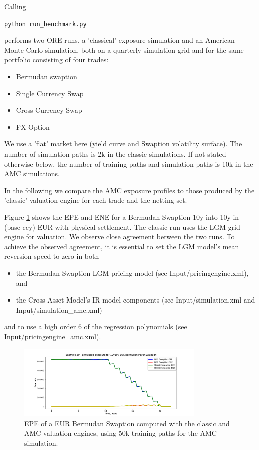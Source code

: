 Calling 

\medskip
\centerline {\tt python run\_benchmark.py} 

\medskip
performs two ORE runs, a 'classical' exposure simulation and an American Monte Carlo simulation, both on a
quarterly simulation grid and for the same portfolio consisting of four trades:

\begin{itemize}
\item Bermudan swaption
\item Single Currency Swap
\item Cross Currency Swap
\item FX Option
\end{itemize}

We use a 'flat' market here (yield curve and Swaption volatility surface). The number of simulation paths
is 2k in the classic simulations. If not stated otherwise below, the number of training paths and simulation
paths is 10k in the AMC simulations. 

In the following we compare the AMC exposure profiles to those produced by the 'classic' valuation engine
for each trade and the netting set. 

Figure \ref{epe_swaption} shows the EPE and ENE for a Bermudan Swaption 10y into 10y in (base ccy) EUR with
physical settlement. The classic run uses the LGM grid engine for valuation. We observe close agreement between
the two runs. To achieve the observed agreement, it is essential to set the LGM model's mean reversion speed
to zero in both
\begin{itemize}
\item the Bermudan Swaption LGM pricing model (see Input/pricingengine.xml), and
\item the Cross Asset Model's IR model components (see Input/simulation.xml and Input/simulation\_amc.xml) 
\end{itemize}
and to use a high order 6 of the regression polynomials (see Input/pricingengine\_amc.xml).
 
\begin{figure}
  \includegraphics[width=0.8\textwidth]{examples/mpl_amc_bermudanswaption.pdf}
  \caption{EPE of a EUR Bermudan Swaption computed with the classic and AMC valuation engines, using 50k
    training paths for the AMC simulation.}
  \label{epe_swaption}
\end{figure}

